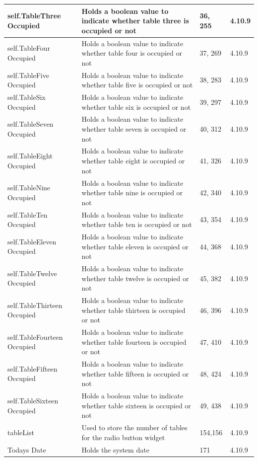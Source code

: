 \begin{center}
\begin{longtable}{|p{3cm}|p{4.5cm}|p{3cm}|p{1cm}|}
self.TableThree Occupied &Holds a boolean value to indicate whether table three is occupied or not &36, 255 &4.10.9 \\ \hline
 self.TableFour Occupied&Holds a boolean value to indicate whether table four is occupied or not &37, 269  & 4.10.9\\ \hline
     self.TableFive Occupied &Holds a boolean value to indicate whether table five is occupied or not &38, 283 &4.10.9 \\ \hline
     self.TableSix Occupied &Holds a boolean value to indicate whether table six is occupied or not &39, 297 &4.10.9 \\ \hline
     self.TableSeven Occupied & Holds a boolean value to indicate whether table seven is occupied or not&40, 312  & 4.10.9\\ \hline
     self.TableEight Occupied&Holds a boolean value to indicate whether table eight is occupied or not & 41, 326 &4.10.9 \\ \hline
     self.TableNine Occupied &Holds a boolean value to indicate whether table nine is occupied or not &42, 340  &4.10.9 \\ \hline
     self.TableTen Occupied &Holds a boolean value to indicate whether table ten is occupied or not & 43, 354 &4.10.9 \\ \hline
     self.TableEleven Occupied&Holds a boolean value to indicate whether table eleven is occupied or not &44, 368  &4.10.9 \\ \hline
     self.TableTwelve Occupied &Holds a boolean value to indicate whether table twelve is occupied or not &45, 382  & 4.10.9\\ \hline
     self.TableThirteen Occupied &Holds a boolean value to indicate whether table thirteen is occupied or not &46, 396 &4.10.9 \\ \hline
     self.TableFourteen Occupied& Holds a boolean value to indicate whether table fourteen is occupied or not&47, 410 &4.10.9 \\ \hline
     self.TableFifteen Occupied &Holds a boolean value to indicate whether table fifteen is occupied or not &48, 424 &4.10.9 \\ \hline
     self.TableSixteen Occupied &Holds a boolean value to indicate whether table sixteen is occupied or not &49, 438 &4.10.9 \\ \hline
tableList & Used to store the number of tables for the radio button widget & 154,156 &4.10.9 \\ \hline
Todays Date & Holds the system date & 171 &4.10.9  \\ \hline

\end{longtable}
\end{center}
